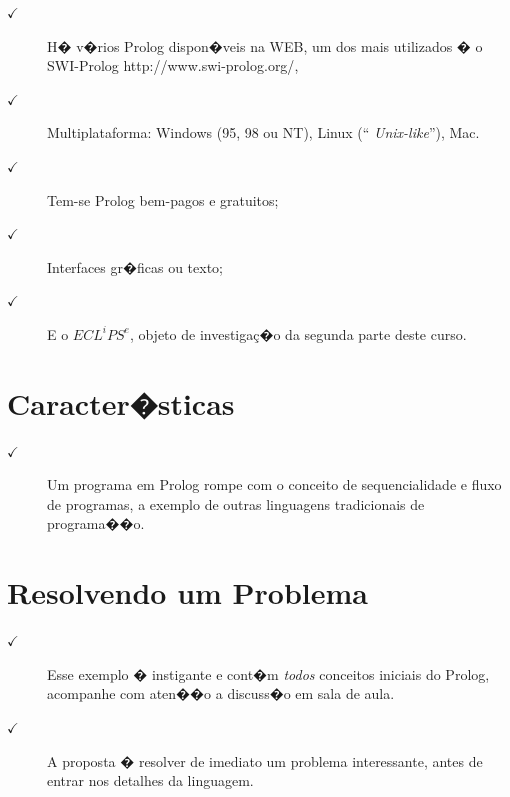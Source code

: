 \documentclass[final,a4paper]{article}
\begin{document}
\begin{description}

\item[$\checkmark $] H� v�rios Prolog dispon�veis na WEB,
um dos mais utilizados � o SWI-Prolog
{\mbox http://www.swi-prolog.org/}, 
\item[$\checkmark $] Multiplataforma:
Windows (95, 98 ou NT), Linux (``{\em
Unix-like}''), Mac.
 \item[$\checkmark $]  Tem-se Prolog bem-pagos e gratuitos;
 \item[$\checkmark $]  Interfaces gr�ficas ou texto;
\item[$\checkmark $]  E o $ECL^iPS^e$,  objeto de investiga\c{c}�o 
da segunda parte deste curso.
\end{description}



\section{Caracter�sticas}

\begin{description}

\item[$\checkmark $]  Um programa em  Prolog rompe
com  o conceito de sequencialidade e fluxo
 de programas, a exemplo de outras linguagens
tradicionais de programa��o.


\end{description}


\section{Resolvendo um Problema}

\begin{description}

\item [$\checkmark $]  Esse exemplo � instigante e cont�m {\em
todos}  conceitos iniciais do Prolog, acompanhe com
aten��o a discuss�o em sala de aula. 

\item [$\checkmark $] A
proposta � resolver de imediato um problema
interessante, antes de entrar nos detalhes
da linguagem. 
\end{description}
\end{document}
